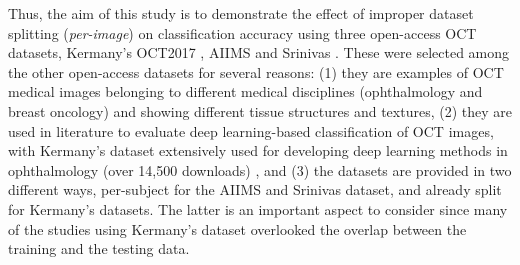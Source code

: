 \documentclass[fleqn,10pt]{wlscirep}
\begin{document}
Thus, the aim of this study is to demonstrate the effect of improper dataset splitting (\textit{per-image}) on classification accuracy using three open-access OCT datasets, Kermany’s OCT2017 \cite{kermany2018large},  AIIMS \cite{butola2019volumetric} and Srinivas \cite{srinivasan2014fully}. These were selected among the other open-access datasets for several reasons: (1) they are examples of OCT medical images belonging to different medical disciplines (ophthalmology and breast oncology) and showing different tissue structures and textures, (2) they are used in literature to evaluate deep learning-based classification of OCT images, with Kermany’s dataset \cite{kermany2018large} extensively used for developing deep learning methods in ophthalmology (over 14,500 downloads) \cite{Retinalkaggle}, and (3) the datasets are provided in two different ways, per-subject for the AIIMS and Srinivas dataset, and already split for Kermany’s datasets. The latter is an important aspect to consider since many of the studies using Kermany’s dataset overlooked the overlap between the training and the testing data. 
\end{document}

